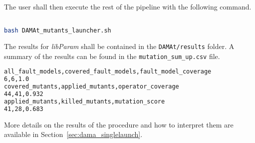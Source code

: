 The user shall then execute the rest of the pipeline with the following command.

\begin{lstlisting}[language=bash]

bash DAMAt_mutants_launcher.sh

\end{lstlisting}

The results for \emph{libParam} shall be contained in the \texttt{DAMAt/results} folder.
A summary of the results can be found in the \texttt{mutation\_sum\_up.csv} file.

\begin{lstlisting}[language=bash]
all_fault_models,covered_fault_models,fault_model_coverage
6,6,1.0
covered_mutants,applied_mutants,operator_coverage
44,41,0.932
applied_mutants,killed_mutants,mutation_score
41,28,0.683
\end{lstlisting}

More details on the results of the \DAMA procedure and how to interpret them are available in Section~\ref{sec:dama_singlelaunch}.
